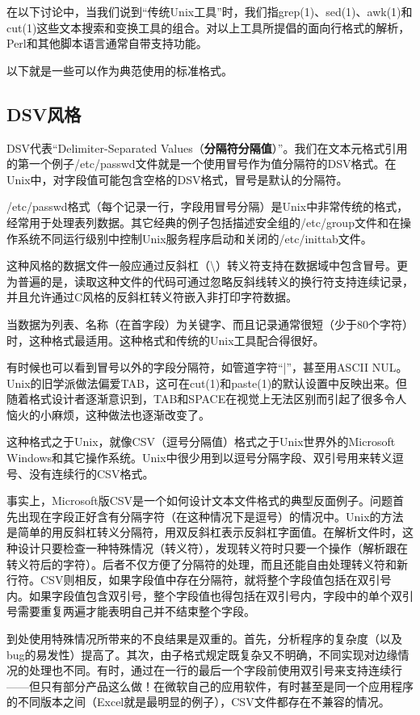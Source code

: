 \documentclass[12pt,oneside]{book}
\begin{document}
在以下讨论中，当我们说到“传统Unix工具”时，我们指grep(1)、sed(1)、awk(1)和cut(1)这些文本搜索和变换工具的组合。对以上工具所提倡的面向行格式的解析，Perl和其他脚本语言通常自带支持功能。

以下就是一些可以作为典范使用的标准格式。



\subsection{DSV风格}
DSV代表“Delimiter-Separated Values（\textbf{分隔符分隔值}）”。我们在文本元格式引用的第一个例子/etc/passwd文件就是一个使用冒号作为值分隔符的DSV格式。在Unix中，对字段值可能包含空格的DSV格式，冒号是默认的分隔符。

/etc/passwd格式（每个记录一行，字段用冒号分隔）是Unix中非常传统的格式，经常用于处理表列数据。其它经典的例子包括描述安全组的/etc/group文件和在操作系统不同运行级别中控制Unix服务程序启动和关闭的/etc/inittab文件。

这种风格的数据文件一般应通过反斜杠（\textbackslash ）转义符支持在数据域中包含冒号。更为普遍的是，读取这种文件的代码可通过忽略反斜线转义的换行符支持连续记录，并且允许通过C风格的反斜杠转义符嵌入非打印字符数据。

当数据为列表、名称（在首字段）为关键字、而且记录通常很短（少于80个字符）时，这种格式最适用。这种格式和传统的Unix工具配合得很好。

有时候也可以看到冒号以外的字段分隔符，如管道字符“|”，甚至用ASCII NUL。Unix的旧学派做法偏爱TAB，这可在cut(1)和paste(1)的默认设置中反映出来。但随着格式设计者逐渐意识到，TAB和SPACE在视觉上无法区别而引起了很多令人恼火的小麻烦，这种做法也逐渐改变了。

这种格式之于Unix，就像CSV（逗号分隔值）格式之于Unix世界外的Microsoft Windows和其它操作系统。Unix中很少用到以逗号分隔字段、双引号用来转义逗号、没有连续行的CSV格式。

事实上，Microsoft版CSV是一个如何设计文本文件格式的典型反面例子。问题首先出现在字段正好含有分隔字符（在这种情况下是逗号）的情况中。Unix的方法是简单的用反斜杠转义分隔符，用双反斜杠表示反斜杠字面值。在解析文件时，这种设计只要检查一种特殊情况（转义符），发现转义符时只要一个操作（解析跟在转义符后的字符）。后者不仅方便了分隔符的处理，而且还能自由处理转义符和新行符。CSV则相反，如果字段值中存在分隔符，就将整个字段值包括在双引号内。如果字段值包含双引号，整个字段值也得包括在双引号内，字段中的单个双引号需要重复两遍才能表明自己并不结束整个字段。

到处使用特殊情况所带来的不良结果是双重的。首先，分析程序的复杂度（以及bug的易发性）提高了。其次，由子格式规定既复杂又不明确，不同实现对边缘情况的处理也不同。有时，通过在一行的最后一个字段前使用双引号来支持连续行——但只有部分产品这么做！在微软自己的应用软件，有时甚至是同一个应用程序的不同版本之间（Excel就是最明显的例子），CSV文件都存在不兼容的情况。
\end{document}
